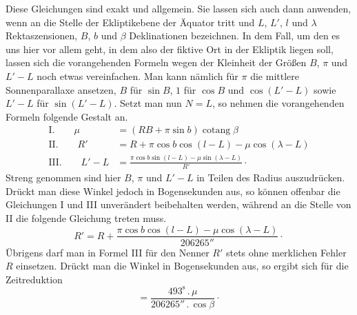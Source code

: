 Diese Gleichungen sind exakt und allgemein. Sie lassen sich auch dann anwenden, wenn an die Stelle der Ekliptikebene der Äquator tritt und $L$, $L'$, $l$ und $\lambda$ Rektaszensionen, $B$, $b$ und $\beta$ Deklinationen bezeichnen. In dem Fall, um den es uns hier vor allem geht, in dem also der fiktive Ort in der Ekliptik liegen soll, lassen sich die vorangehenden Formeln wegen der Kleinheit der Größen $B$, $\pi$ und $L'-L$ noch etwas vereinfachen. Man kann nämlich für $\pi$ die mittlere Sonnenparallaxe ansetzen, $B$ für $\sin B$, $1$ für $\cos B$ und $\cos(L'-L)$ sowie $L'-L$ für $\sin(L'-L)$. Setzt man nun $N=L$, so nehmen die vorangehenden Formeln folgende Gestalt an.
\[
\begin{aligned}
\mathrm{I.}\qquad \mu&=(RB+\pi\sin b)\operatorname{cotang}\beta\\
\mathrm{II.}\qquad R'&=R+\pi\cos b\cos(l-L)-\mu\cos(\lambda-L)\\
\mathrm{III.}\qquad L'-L&=\frac{\pi\cos b\sin(l-L)-\mu\sin(\lambda-L)}{R'}\mathpunct{\cdot}
\end{aligned}
\]
Streng genommen sind hier $B$, $\pi$ und $L'-L$ in Teilen des Radius auszudrücken. Drückt man diese Winkel jedoch in Bogensekunden aus, so können offenbar die Gleichungen I und III unverändert beibehalten werden, während an die Stelle von II die folgende Gleichung treten muss.
\[
R'=R+\frac{\pi\cos b\cos(l-L)-\mu\cos(\lambda-L)}{206265''}\mathpunct{\cdot}
\]
Übrigens darf man in Formel III für den Nenner $R'$ stets ohne merklichen Fehler $R$ einsetzen. Drückt man die Winkel in Bogensekunden aus, so ergibt sich für die Zeitreduktion
\[
=\frac{493^{\mathrm{s}}\mathpunct{.}\mu}{206265''\mathpunct{.}\cos\beta}\mathpunct{\cdot}
\]

